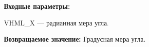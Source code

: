\textbf{Входные параметры:}

 VHML\_X --- радианная мера угла.

\textbf{Возвращаемое значение:}
Градусная мера угла.